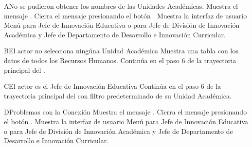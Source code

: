 \begin{UCtrayectoriaA}{A}{No se pudieron obtener los nombres de las Unidades Académicas.}
    \UCpaso Muestra el mensaje .
    \UCpaso[\UCactor] Cierra el mensaje presionando el botón .
     \UCpaso Muestra la interfaz de usuario Menú para Jefe de Innovación Educativa  o  para Jefe de División de Innovación Académica y Jefe de Departamento de Desarrollo e Innovación Curricular.
\end{UCtrayectoriaA}

\begin{UCtrayectoriaA}{B}{El actor no selecciona ningúna Unidad Académica}
    \UCpaso Muestra una tabla con los datos de todos los Recursos Humanos.
    \UCpaso Continúa en el paso 6 de la trayectoria principal del .
\end{UCtrayectoriaA}

\begin{UCtrayectoriaA}{C}{El actor es el Jefe de Innovación Educativa}
    \UCpaso Continúa en el paso 6 de la trayectoria principal del  con filtro predeterminado de su Unidad Académica.
\end{UCtrayectoriaA}
\begin{UCtrayectoriaA}{D}{Problemas con la Conexión}
    \UCpaso Muestra el mensaje .
    \UCpaso[\UCactor] Cierra el mensaje presionando el botón .
    \UCpaso Muestra la interfaz de usuario Menú para Jefe de Innovación Educativa  o  para Jefe de División de Innovación Académica y Jefe de Departamento de Desarrollo e Innovación Curricular.
\end{UCtrayectoriaA}